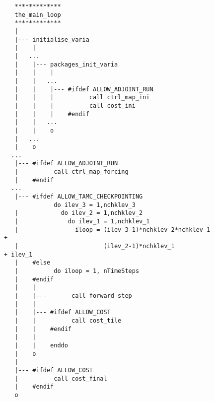 \begin{figure}

{\scriptsize
\begin{verbatim}
   *************
   the_main_loop
   *************
   |
   |--- initialise_varia
   |    |
   |   ...
   |    |--- packages_init_varia
   |    |    |
   |    |   ...
   |    |    |--- #ifdef ALLOW_ADJOINT_RUN
   |    |    |          call ctrl_map_ini
   |    |    |          call cost_ini
   |    |    |    #endif
   |    |   ...
   |    |    o
   |   ...
   |    o
  ...
   |--- #ifdef ALLOW_ADJOINT_RUN
   |          call ctrl_map_forcing
   |    #endif
  ...
   |--- #ifdef ALLOW_TAMC_CHECKPOINTING
              do ilev_3 = 1,nchklev_3
   |            do ilev_2 = 1,nchklev_2
   |              do ilev_1 = 1,nchklev_1
   |                iloop = (ilev_3-1)*nchklev_2*nchklev_1 +
   |                        (ilev_2-1)*nchklev_1           + ilev_1
   |    #else
   |          do iloop = 1, nTimeSteps
   |    #endif
   |    |
   |    |---       call forward_step
   |    |
   |    |--- #ifdef ALLOW_COST
   |    |          call cost_tile
   |    |    #endif
   |    |
   |    |    enddo
   |    o
   |
   |--- #ifdef ALLOW_COST
   |          call cost_final
   |    #endif
   o
\end{verbatim}
}
\caption{~}
\label{fig:adthemain}
\end{figure}
